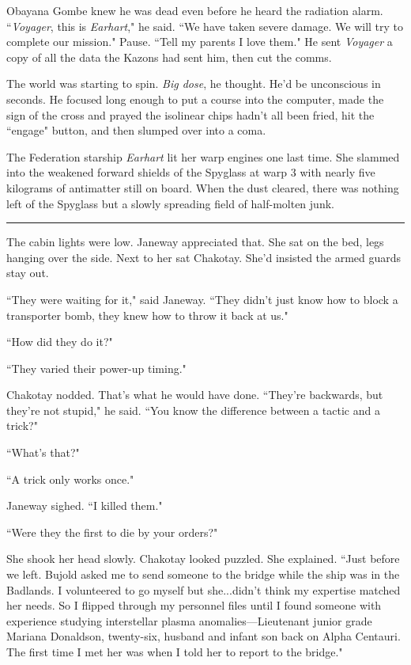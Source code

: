 \documentclass[twoside,letterpaper,12pt]{memoir}
\begin{document}
Obayana Gombe knew he was dead even before he heard the radiation alarm. ``\textit{Voyager}, this is \textit{Earhart}," he said. ``We have taken severe damage. We will try to complete our mission." Pause. ``Tell my parents I love them." He sent \textit{Voyager} a copy of all the data the Kazons had sent him, then cut the comms.

The world was starting to spin. \textit{Big dose}, he thought. He'd be unconscious in seconds. He focused long enough to put a course into the computer, made the sign of the cross and prayed the isolinear chips hadn't all been fried, hit the ``engage" button, and then slumped over into a coma.

The Federation starship \textit{Earhart} lit her warp engines one last time. She slammed into the weakened forward shields of the Spyglass at warp 3 with nearly five kilograms of antimatter still on board. When the dust cleared, there was nothing left of the Spyglass but a slowly spreading field of half-molten junk.

\begin{center}\rule{3cm}{0.4 pt}\end{center}

The cabin lights were low. Janeway appreciated that. She sat on the bed, legs hanging over the side. Next to her sat Chakotay. She'd insisted the armed guards stay out.

``They were waiting for it," said Janeway. ``They didn't just know how to block a transporter bomb, they knew how to throw it back at us."

``How did they do it?"

``They varied their power-up timing."

Chakotay nodded. That's what he would have done. ``They're backwards, but they're not stupid," he said. ``You know the difference between a tactic and a trick?"

``What's that?"

``A trick only works once."

Janeway sighed. ``I killed them."

``Were they the first to die by your orders?"

She shook her head slowly. Chakotay looked puzzled. She explained. ``Just before we left. Bujold asked me to send someone to the bridge while the ship was in the Badlands. I volunteered to go myself but she...didn't think my expertise matched her needs. So I flipped through my personnel files until I found someone with experience studying interstellar plasma anomalies—Lieutenant junior grade Mariana Donaldson, twenty-six, husband and infant son back on Alpha Centauri. The first time I met her was when I told her to report to the bridge."
\end{document}
